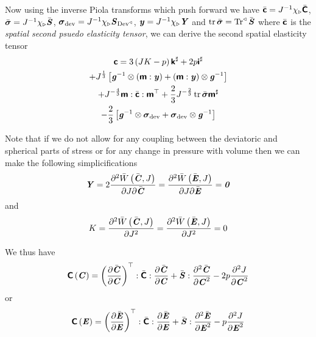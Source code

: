 Now using the inverse Piola transforms which push forward we have
$\bar{\boldsymbol{\mathsf{c}}}={J}^{-1} \chi_{\triangleright}\bar{\boldsymbol{\mathsf{C}}} $,
$\bar{\boldsymbol{\mathit{\sigma}}}={J}^{-1} \chi_{\triangleright}\bar{\boldsymbol{\mathit{S}}} $,
$\boldsymbol{\mathit{\sigma}}_{\operatorname{dev}}={J}^{-1} \chi_{\triangleright}\boldsymbol{\mathit{S}}_{ \operatorname{Dev}^{\triangleleft} } $,
$\boldsymbol{\mathit{y}}={J}^{-1} \chi_{\triangleright}\boldsymbol{\mathit{Y}} $ and
$\operatorname{tr}\bar{\boldsymbol{\mathit{\sigma}}}= \operatorname{Tr}^{\triangleleft} \bar{\boldsymbol{\mathit{S}}}$ where
$\bar{\boldsymbol{\mathsf{c}}}$ is the \emph{spatial second psuedo elasticity
  tensor}, we can derive the second spatial elasticity tensor \ie
\begin{multline}
  \boldsymbol{\mathsf{c}}=3\left( JK-p \right)\boldsymbol{\mathsf{k}}^{\sharp}+2p\boldsymbol{\mathsf{i}}^{\sharp}\\
  +J^{\frac{1}{3}}\left[  {\boldsymbol{\mathit{g}}}^{-1} \otimes \left(  \boldsymbol{\mathsf{m}} : \boldsymbol{\mathit{y}}  \right) + \left(  \boldsymbol{\mathsf{m}} : \boldsymbol{\mathit{y}}  \right) \otimes {\ensuremath{\boldsymbol{\mathit{g}}}}^{-1}  \right]
  \\
  +J^{-\frac{4}{3}} \boldsymbol{\mathsf{m}} : \bar{\boldsymbol{\mathsf{c}}} :  {\boldsymbol{\mathsf{m}}}^{ \top }  +\dfrac{2}{3}J^{-\frac{2}{3}}\operatorname{tr}\bar{\boldsymbol{\mathit{\sigma}}}\boldsymbol{\mathsf{m}}^{\sharp}\\
  -\dfrac{2}{3}\left[  {\boldsymbol{\mathit{g}}}^{-1} \otimes \boldsymbol{\mathit{\sigma}}_{\operatorname{dev}} + \boldsymbol{\mathit{\sigma}}_{\operatorname{dev}} \otimes {\ensuremath{\boldsymbol{\mathit{g}}}}^{-1}  \right]
\end{multline}

Note that if we do not allow for any coupling between the deviatoric and
spherical parts of stress or for any change in pressure with volume then we
can make the following simplicifications
\begin{equation}
  \boldsymbol{\mathit{Y}}=2 \dfrac{\partial^{2}  \bar{W}\left( \bar{\boldsymbol{\mathit{C}}},J \right) }{\partial J \partial \bar{\boldsymbol{\mathit{C}}}} = \dfrac{\partial^{2}  \bar{W}\left( \bar{\boldsymbol{\mathit{E}}},J \right) }{\partial J \partial \bar{\boldsymbol{\mathit{E}}}} =\boldsymbol{\mathit{0}}
\end{equation}
and
\begin{equation}
  K= \dfrac{\partial^{2}  \bar{W}\left( \bar{\boldsymbol{\mathit{C}}},J \right) }{\partial {J}^{2}} = \dfrac{\partial^{2}  \bar{W}\left( \bar{\boldsymbol{\mathit{E}}},J \right) }{\partial {J}^{2}} =0
\end{equation}

We thus have
\begin{equation}
   \boldsymbol{\mathsf{C}}\left( \boldsymbol{\mathit{C}} \right) =  {\left(  \dfrac{\partial \bar{\boldsymbol{\mathit{C}}}}{\partial \boldsymbol{\mathit{C}}}  \right)}^{ \top }  : \bar{\boldsymbol{\mathsf{C}}} :  \dfrac{\partial \bar{\boldsymbol{\mathit{C}}}}{\partial \boldsymbol{\mathit{C}}}  + \bar{\boldsymbol{\mathit{S}}} :  \dfrac{\partial^{2} \bar{\boldsymbol{\mathit{C}}}}{\partial {\ensuremath{\boldsymbol{\mathit{C}}}}^{2}}  -2p \dfrac{\partial^{2} J}{\partial {\ensuremath{\boldsymbol{\mathit{C}}}}^{2}} 
\end{equation}
or
\begin{equation}
   \boldsymbol{\mathsf{C}}\left( \boldsymbol{\mathit{E}} \right) =  {\left(  \dfrac{\partial \bar{\boldsymbol{\mathit{E}}}}{\partial \boldsymbol{\mathit{E}}}  \right)}^{ \top }  : \bar{\boldsymbol{\mathsf{C}}} :  \dfrac{\partial \bar{\boldsymbol{\mathit{E}}}}{\partial \boldsymbol{\mathit{E}}}  + \bar{\boldsymbol{\mathit{S}}} :  \dfrac{\partial^{2} \bar{\boldsymbol{\mathit{E}}}}{\partial {\ensuremath{\boldsymbol{\mathit{E}}}}^{2}}  -p \dfrac{\partial^{2} J}{\partial {\ensuremath{\boldsymbol{\mathit{E}}}}^{2}} 
\end{equation}

